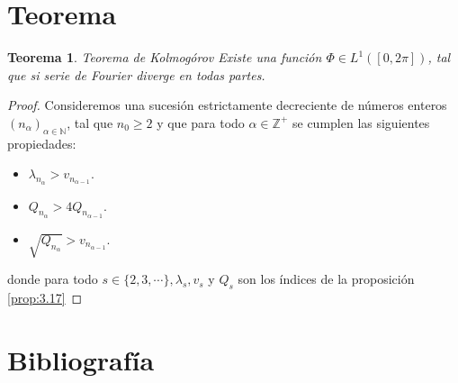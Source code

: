 \documentclass{article}
\newtheorem{theorem}{Teorema}
\begin{document}
\section{Teorema}
\begin{theorem}{Teorema de Kolmogórov}
  Existe una función $\Phi\in L^{1}([0,2\pi])$, tal que si serie de Fourier diverge en todas partes.
\end{theorem}
\begin{proof} 
  Consideremos una sucesión estrictamente decreciente de números enteros $(n_{\alpha})_{\alpha\in\mathbb{N}}$, tal que $n_0\geq 2$ y que para todo $\alpha\in \mathbb{Z}^{+}$ se cumplen las siguientes propiedades:
  \begin{itemize}
    \item $\lambda_{n_{\alpha}}>v_{n_{\alpha-1}}$.
    \item $Q_{n_{\alpha}}>4Q_{n_{\alpha-1}}$.
    \item $\sqrt{Q_{n_{\alpha}}}>v_{n_{\alpha-1}}$.
  \end{itemize}
  donde para todo $s\in\{2,3,\cdots\}, \lambda_s,v_{s}$ y $Q_{s}$ son los índices de la proposición \ref{prop:3.17}
\end{proof}

\section{Bibliografía}


\end{document}
